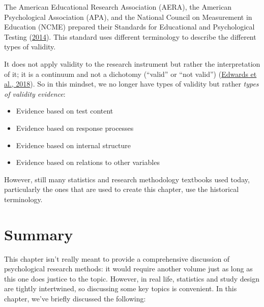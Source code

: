 \documentclass[
  11pt,
  a4paper,
  twoside,symmetric,openright]{book}
\providecommand{\tightlist}{%
  \setlength{\itemsep}{0pt}\setlength{\parskip}{0pt}}
\theoremstyle{break}
\theoremstyle{break}
\begin{document}
\hypertarget{calloutvalidityterminology}{}
\begin{callout}

The American Educational Research Association (AERA), the American Psychological Association (APA), and the National Council on Measurement in Education (NCME) prepared their Standards for Educational and Psychological Testing (\protect\hyperlink{ref-americaneducationalresearchassociationStandardsEducationalPsychological2014}{2014}). This standard uses different terminology to describe the different types of validity.

It does not apply validity to the research instrument but rather the interpretation of it; it is a continuum and not a dichotomy (``valid'' or ``not valid'') (\protect\hyperlink{ref-edwardsFitPurposeModern2018}{Edwards et al., 2018}). So in this mindset, we no longer have types of validity but rather \emph{types of validity evidence}:

\begin{itemize}
\tightlist
\item
  Evidence based on test content
\item
  Evidence based on response processes
\item
  Evidence based on internal structure
\item
  Evidence based on relations to other variables
\end{itemize}

However, still many statistics and research methodology textbooks used today, particularly the ones that are used to create this chapter, use the historical terminology.

\end{callout}

\hypertarget{summary}{%
\section*{Summary}\label{summary}}

This chapter isn't really meant to provide a comprehensive discussion of psychological research methods: it would require another volume just as long as this one does justice to the topic. However, in real life, statistics and study design are tightly intertwined, so discussing some key topics is convenient. In this chapter, we've briefly discussed the following:
\end{document}
